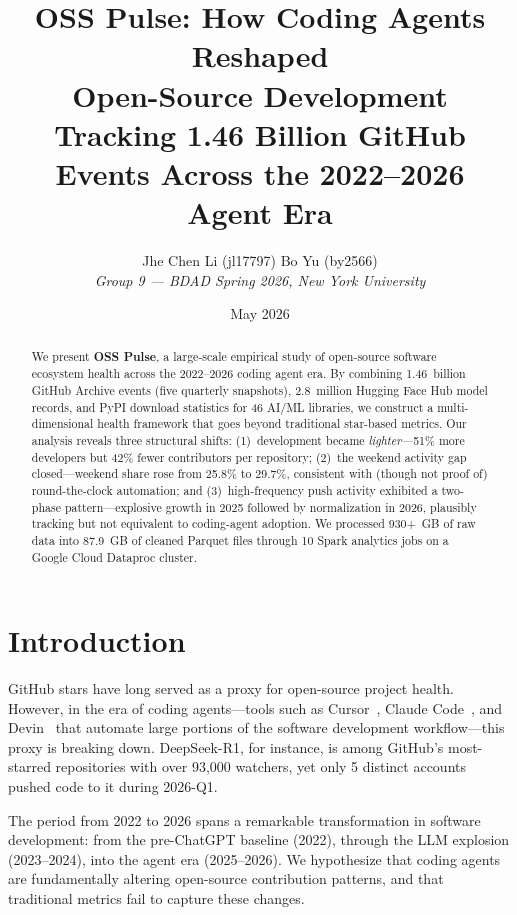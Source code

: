 \documentclass[11pt,twocolumn]{article}
\title{\textbf{OSS Pulse: How Coding Agents Reshaped\\Open-Source Development}\\[6pt]
\large Tracking 1.46 Billion GitHub Events Across the 2022--2026 Agent Era}
\author{
  Jhe Chen Li (jl17797) \qquad Bo Yu (by2566)\\
  \textit{Group 9 --- BDAD Spring 2026, New York University}
}
\date{May 2026}
\begin{document}
\maketitle

\begin{abstract}
We present \textbf{OSS Pulse}, a large-scale empirical study of open-source software ecosystem health across the 2022--2026 coding agent era.
By combining 1.46~billion GitHub Archive events (five quarterly snapshots), 2.8~million Hugging Face Hub model records, and PyPI download statistics for 46 AI/ML libraries, we construct a multi-dimensional health framework that goes beyond traditional star-based metrics.
Our analysis reveals three structural shifts: (1)~development became \emph{lighter}---51\% more developers but 42\% fewer contributors per repository; (2)~the weekend activity gap closed---weekend share rose from 25.8\% to 29.7\%, consistent with (though not proof of) round-the-clock automation; and (3)~high-frequency push activity exhibited a two-phase pattern---explosive growth in 2025 followed by normalization in 2026, plausibly tracking but not equivalent to coding-agent adoption.
We processed 930+~GB of raw data into 87.9~GB of cleaned Parquet files through 10 Spark analytics jobs on a Google Cloud Dataproc cluster.
\end{abstract}

\section{Introduction}\label{sec:intro}

GitHub stars have long served as a proxy for open-source project health.
However, in the era of coding agents---tools such as Cursor~\cite{cursor}, Claude Code~\cite{claudecode}, and Devin~\cite{devin} that automate large portions of the software development workflow---this proxy is breaking down.
DeepSeek-R1, for instance, is among GitHub's most-starred repositories with over 93,000 watchers, yet only 5 distinct accounts pushed code to it during 2026-Q1.

The period from 2022 to 2026 spans a remarkable transformation in software development: from the pre-ChatGPT baseline (2022), through the LLM explosion (2023--2024), into the agent era (2025--2026).
We hypothesize that coding agents are fundamentally altering open-source contribution patterns, and that traditional metrics fail to capture these changes.
\end{document}
